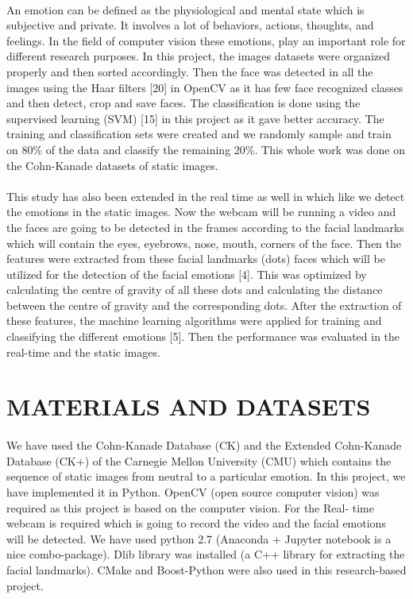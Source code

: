 \documentclass[a4paper,12pt,oneside]{article}
\begin{document}
\paragraph{}
An emotion can be defined as the physiological and
mental state which is subjective and private. It involves
a lot of behaviors, actions, thoughts, and feelings. In the
field of computer vision these emotions, play an
important role for different research purposes. In this
project, the images datasets were organized properly and
then sorted accordingly. Then the face was detected in
all the images using the Haar filters [20] in OpenCV as
it has few face recognized classes and then detect, crop
and save faces. The classification is done using the
supervised learning (SVM) [15] in this project as it gave
better accuracy. The training and classification sets were
created and we randomly sample and train on 80\% of the
data and classify the remaining 20\%. This whole work
was done on the Cohn-Kanade datasets of static images.
\paragraph{}
This study has also been extended in the real time as well
in which like we detect the emotions in the static images.
Now the webcam will be running a video and the faces
are going to be detected in the frames according to the
facial landmarks which will contain the eyes, eyebrows,
nose, mouth, corners of the face. Then the features were
extracted from these facial landmarks (dots) faces which
will be utilized for the detection of the facial emotions
[4]. This was optimized by calculating the centre of
gravity of all these dots and calculating the distance
between the centre of gravity and the corresponding dots.
After the extraction of these features, the machine
learning algorithms were applied for training and
classifying the different emotions [5]. Then the
performance was evaluated in the real-time and the static
images.


\newpage
\section{MATERIALS AND DATASETS}
\paragraph{}
We have used the Cohn-Kanade Database (CK) and the
Extended Cohn-Kanade Database (CK+) of the Carnegie
Mellon University (CMU) which contains the sequence
of static images from neutral to a particular emotion. In
this project, we have implemented it in Python. OpenCV
(open source computer vision) was required as this
project is based on the computer vision. For the Real-
time webcam is required which is going to record the
video and the facial emotions will be detected. We have
used python 2.7 (Anaconda + Jupyter notebook is a nice
combo-package). Dlib library was installed (a C++
library for extracting the facial landmarks). CMake and
Boost-Python were also used in this research-based
project.
\end{document}
